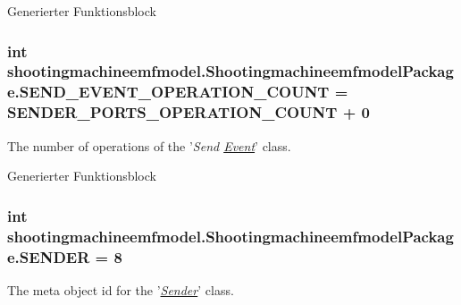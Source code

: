 Generierter Funktionsblock  \hypertarget{interfaceshootingmachineemfmodel_1_1_shootingmachineemfmodel_package_a045b9f38762d5bce6cdb17e1bb5ba17e}{
\subsubsection[{S\-E\-N\-D\-\_\-\-E\-V\-E\-N\-T\-\_\-\-O\-P\-E\-R\-A\-T\-I\-O\-N\-\_\-\-C\-O\-U\-N\-T}]{\setlength{\rightskip}{0pt plus 5cm}int shootingmachineemfmodel.\-Shootingmachineemfmodel\-Package.\-S\-E\-N\-D\-\_\-\-E\-V\-E\-N\-T\-\_\-\-O\-P\-E\-R\-A\-T\-I\-O\-N\-\_\-\-C\-O\-U\-N\-T = {\bf S\-E\-N\-D\-E\-R\-\_\-\-P\-O\-R\-T\-S\-\_\-\-O\-P\-E\-R\-A\-T\-I\-O\-N\-\_\-\-C\-O\-U\-N\-T} + 0}}\label{interfaceshootingmachineemfmodel_1_1_shootingmachineemfmodel_package_a045b9f38762d5bce6cdb17e1bb5ba17e}
The number of operations of the '{\itshape Send \hyperlink{interfaceshootingmachineemfmodel_1_1_event}{Event}}' class.

Generierter Funktionsblock  \hypertarget{interfaceshootingmachineemfmodel_1_1_shootingmachineemfmodel_package_a249e6702143a85bb37cc88a615e3e085}{
\subsubsection[{S\-E\-N\-D\-E\-R}]{\setlength{\rightskip}{0pt plus 5cm}int shootingmachineemfmodel.\-Shootingmachineemfmodel\-Package.\-S\-E\-N\-D\-E\-R = 8}}\label{interfaceshootingmachineemfmodel_1_1_shootingmachineemfmodel_package_a249e6702143a85bb37cc88a615e3e085}
The meta object id for the '\hyperlink{classshootingmachineemfmodel_1_1impl_1_1_sender_impl}{{\itshape Sender}}' class.

